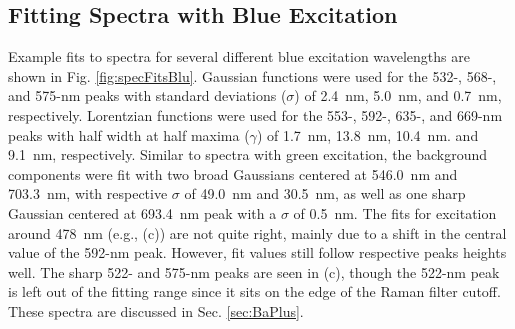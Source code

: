 \subsection{Fitting Spectra with Blue Excitation}
\label{subsec:fitblu} %

Example fits to spectra for several different blue excitation wavelengths are shown in Fig. \ref{fig:specFitsBlu}.  Gaussian functions were used for the 532-, 568-, and 575-nm peaks with standard deviations ($\sigma$) of 2.4~nm, 5.0~nm, and 0.7~nm, respectively.  Lorentzian functions were used for the 553-, 592-, 635-, and 669-nm peaks with half width at half maxima ($\gamma$) of 1.7~nm, 13.8~nm, 10.4~nm. and 9.1~nm, respectively.  Similar to spectra with green excitation, the background components were fit with two broad Gaussians centered at 546.0~nm and 703.3~nm, with respective $\sigma$ of 49.0~nm and 30.5~nm, as well as one sharp Gaussian centered at 693.4~nm peak with a $\sigma$ of 0.5~nm.  The fits for excitation around 478~nm (e.g., (c)) are not quite right, mainly due to a shift in the central value of the 592-nm peak.  However, fit values still follow respective peaks heights well.  The sharp 522- and 575-nm peaks are seen in (c), though the 522-nm peak is left out of the fitting range since it sits on the edge of the Raman filter cutoff.   These spectra are discussed in Sec. \ref{sec:BaPlus}.

